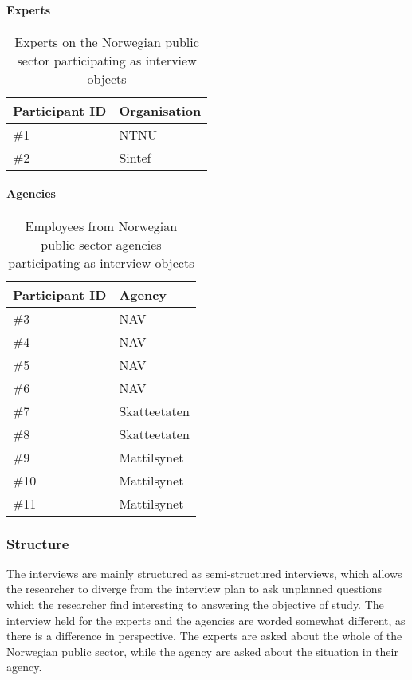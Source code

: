 \paragraph{Experts} \hspace{0cm}
\begin{table}[H]
\centering
\begin{tabular}{|l|l|}
\hline
\textbf{Participant ID} & \textbf{Organisation} \\ \hline
\#1 & NTNU  \\ \hline
\#2 & Sintef \\ \hline
\end{tabular}
\caption{Experts on the Norwegian public sector participating as interview objects}
\label{tab:expert_participants}
\end{table}

\paragraph{Agencies} \hspace{0cm}
\begin{table}[H]
\centering
\begin{tabular}{|l|l|}
\hline
\textbf{Participant ID} & \textbf{Agency} \\ \hline
\#3 & NAV  \\ \hline
\#4 & NAV  \\ \hline
\#5 & NAV  \\ \hline
\#6 & NAV  \\ \hline
\#7 & Skatteetaten  \\ \hline
\#8 & Skatteetaten  \\ \hline
\#9 & Mattilsynet  \\ \hline
\#10 & Mattilsynet  \\ \hline
\#11 & Mattilsynet  \\ \hline
\end{tabular}
\caption{Employees from Norwegian public sector agencies participating as interview objects}
\label{tab:agency_participants}
\end{table}


\subsubsection{Structure}
The interviews are mainly structured as semi-structured interviews, which allows the researcher to diverge from the interview plan to ask unplanned questions which the researcher find interesting to answering the objective of study. The interview held for the experts and the agencies are worded somewhat different, as there is a difference in perspective. The experts are asked about the whole of the Norwegian public sector, while the agency are asked about the situation in their agency.

